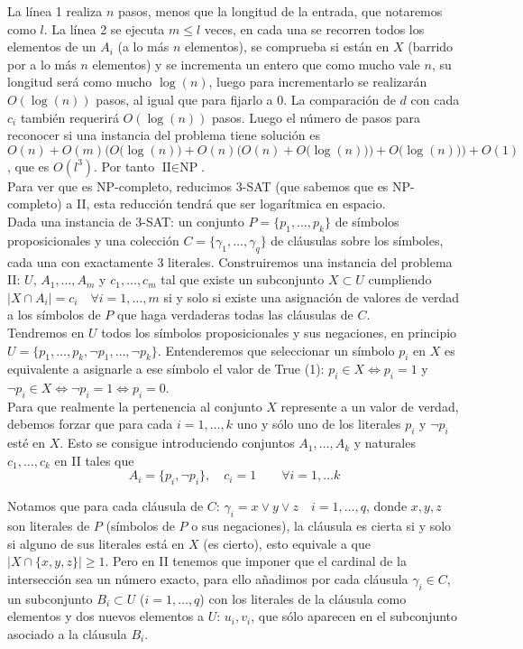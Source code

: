 \documentclass{article}
\begin{document}
La línea 1 realiza $n$ pasos, menos que la longitud de la entrada, que
notaremos como $l$. La línea 2 se ejecuta $m\leq l$ veces, en cada una
se recorren todos los elementos de un $A_i$ (a lo más $n$ elementos),
se comprueba si están en $X$ (barrido por a lo más $n$ elementos) y se
incrementa un entero que como mucho vale $n$, su longitud será como
mucho $\log(n)$, luego para incrementarlo se realizarán $O(\log(n))$
pasos, al igual que para fijarlo a 0. La comparación de $d$ con cada
$c_i$ también requerirá $O(\log(n))$ pasos. Luego el número de pasos
para reconocer si una instancia del problema tiene solución es
$O(n)+O(m)\Big(O\big(\log(n)\big)+O(n)\big(O(n)+O\big(\log(n)\big)\big)+O\big(\log(n)\big)\Big)+O(1)$, que es $O(l^3)$. Por tanto $\text{II} \in \text{NP}$.\\

Para ver que es NP-completo, reducimos 3-SAT (que sabemos que es
NP-completo) a II, esta reducción tendrá que ser logarítmica en espacio. \\

Dada una instancia de 3-SAT: un conjunto $P=\{p_1,\ldots,p_k\}$ de
símbolos proposicionales y una colección
$C=\{\gamma_1,\ldots,\gamma_q\}$ de cláusulas sobre los símboles, cada
una con exactamente 3 literales.  Construiremos una instancia del
problema II: $U$, $A_1,\ldots,A_m$ y $c_1,\ldots,c_m$ tal que existe
un subconjunto $X\subset U$ cumpliendo
$|X\cap A_i|=c_i\quad\forall i=1,\ldots,m$ si y solo si existe una
asignación de valores de verdad a los símbolos de $P$ que haga
verdaderas todas las cláusulas de $C$. \\

Tendremos en $U$ todos los símbolos proposicionales y sus negaciones,
en principio $U=\{p_1,\ldots,p_k,\neg p_1,\ldots,\neg p_k\}$.
Entenderemos que seleccionar un símbolo $p_i$ en $X$ es equivalente a
asignarle a ese símbolo el valor de True (1):
$p_i\in X\Leftrightarrow p_i=1$ y
$\neg p_i \in X\Leftrightarrow \neg p_i=1 \Leftrightarrow p_i=0$. \\

Para que realmente la pertenencia al conjunto $X$ represente a un
valor de verdad, debemos forzar que para cada $i=1,\ldots,k$ uno y
sólo uno de los literales $p_i$ y $\neg p_i$ esté en $X$. Esto se
consigue introduciendo conjuntos $A_1,\ldots,A_k$ y naturales
$c_1,\ldots,c_k$ en II tales que
\[A_i=\{p_i,\neg p_i\},\quad c_i=1\qquad \forall i=1,\ldots k\]

Notamos que para cada cláusula de $C$:
$\gamma_i=x\vee y\vee z\quad i=1,\ldots,q$, donde $x,y,z$ son
literales de $P$ (símbolos de $P$ o sus negaciones), la cláusula es
cierta si y solo si alguno de sus literales está en $X$ (es
cierto), esto equivale a que $|X\cap\{x,y,z\}|\geq 1$. Pero en II
tenemos que imponer que el cardinal de la intersección sea un número
exacto, para ello añadimos por cada cláusula $\gamma_i\in C$, un
subconjunto $B_i\subset U$ ($i=1,\ldots,q$) con los literales de la
cláusula como elementos y dos nuevos elementos a $U$: $u_i,v_i$, que
sólo aparecen en el subconjunto asociado a la cláusula $B_i$. \\
\end{document}
